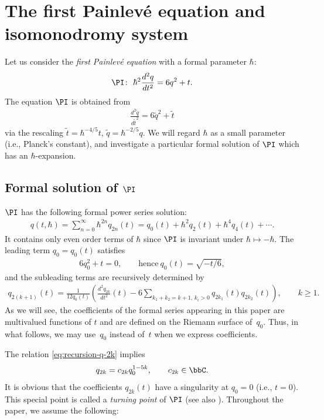 \section{The f\/irst Painlev\'e equation and isomonodromy system}\label{section2}


Let us consider the {\em first Painlev\'e equation}
with a formal parameter $\hbar$:
\begin{gather*}
\PI\colon \
\hbar^{2} \frac{d^{2}q}{dt^{2}} = 6q^{2} + t.
\end{gather*}
The equation $\PI$ is obtained from
\begin{gather*}
\frac{d^{2} \tilde{q}}{d\tilde{t}^{2}} =
6 \tilde{q}^{2} + \tilde{t}
\end{gather*}
via the rescaling
$\tilde{t} = \hbar^{-4/5} t$,
$\tilde{q} = \hbar^{-2/5} q$.
We will regard $\hbar$ as a small parameter (i.e., Planck's constant),
and investigate a particular formal solution
of $\PI$ which has an $\hbar$-expansion.

\subsection[Formal solution of $\PI$]{Formal solution of $\boldsymbol{\PI}$}

$\PI$ has the following formal power series solution:
\begin{gather} \label{eq:formal-q}
q(t,\hbar) = \sum_{n=0}^{\infty} \hbar^{2n}q_{2n}(t)
= q_{0}(t) + \hbar^{2} q_{2}(t)
+ \hbar^{4} q_{4}(t) + \cdots.
\end{gather}
It contains only even order terms of $\hbar$ since $\PI$
is invariant under $\hbar \mapsto - \hbar$.
The leading term $q_{0} = q_{0}(t)$ satisf\/ies
\begin{gather} \label{eq:q0}
6q_{0}^{2} + t = 0, \qquad \text{hence}~q_{0}(t)=\sqrt{-t/6},
\end{gather}
and the subleading terms are recursively determined by
\begin{gather} \label{eq:recursion-q-2k}
q_{2(k+1)}(t) = \frac{1}{12 q_{0}(t)} \left(
\frac{d^{2} q_{2k}}{dt^{2}}(t)  -
6 \sum_{k_{1}+k_{2} = k+1,\,  k_{i}>0} q_{2k_{1}}(t) q_{2k_{2}}(t)
\right), \qquad k \ge 1.
\end{gather}
As we will see, the coef\/f\/icients of the formal series appearing in
this paper are multivalued functions of $t$ and are def\/ined
on the Riemann surface of~$q_{0}$. Thus, in what follows,
we may use~$q_{0}$ instead of~$t$ when we express coef\/f\/icients.

The relation \eqref{eq:recursion-q-2k} implies
\begin{gather*}
q_{2k} =
c_{2k} q_{0}^{1-5k}, \qquad c_{2k} \in \bbC .
\end{gather*}
It is obvious that the coef\/f\/icients $q_{2k}(t)$ have
a singularity at $q_{0} = 0$ (i.e., $t = 0$).
This special point is called a {\em turning point} of $\PI$
\cite[Def\/inition 2.1]{KT-PI} (see also \cite[Section~4]{KT05}).
Throughout the paper, we assume the following:

